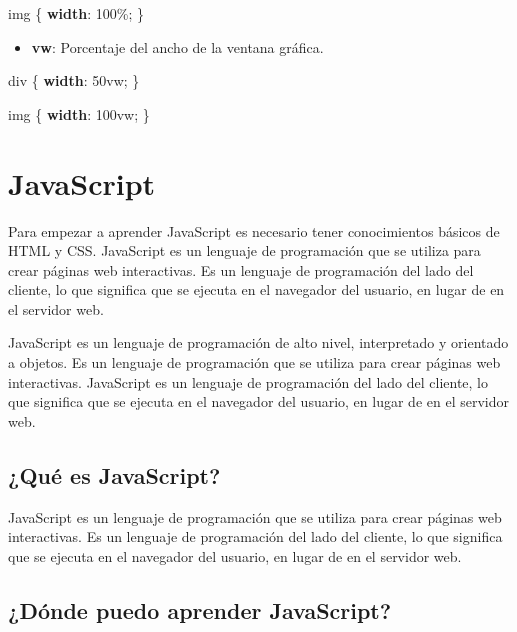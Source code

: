 \documentclass[
  a4paper,
  DIV=11,
  numbers=noendperiod,
  onepage,
  openany]{scrreprt}
\newenvironment{Shaded}{\begin{snugshade}}{\end{snugshade}}
\newcommand{\CharTok}[1]{\textcolor[rgb]{0.13,0.47,0.30}{#1}}
\newcommand{\DataTypeTok}[1]{\textcolor[rgb]{0.68,0.00,0.00}{#1}}
\newcommand{\DecValTok}[1]{\textcolor[rgb]{0.68,0.00,0.00}{#1}}
\newcommand{\KeywordTok}[1]{\textcolor[rgb]{0.00,0.23,0.31}{\textbf{#1}}}
\newcommand{\NormalTok}[1]{\textcolor[rgb]{0.00,0.23,0.31}{#1}}
\newcommand{\OperatorTok}[1]{\textcolor[rgb]{0.37,0.37,0.37}{#1}}
\providecommand{\tightlist}{%
  \setlength{\itemsep}{0pt}\setlength{\parskip}{0pt}}\usepackage{longtable,booktabs,array}
\begin{document}
\begin{tcolorbox}
\begin{Shaded}
\begin{Highlighting}[]
\NormalTok{img \{}
  \KeywordTok{width}\CharTok{:} \DecValTok{100}\DataTypeTok{\%}\OperatorTok{;}
\NormalTok{\}}
\end{Highlighting}
\end{Shaded}

\begin{itemize}
\tightlist
\item
  \textbf{vw}: Porcentaje del ancho de la ventana gráfica.
\end{itemize}

\begin{Shaded}
\begin{Highlighting}[]
\NormalTok{div \{}
  \KeywordTok{width}\CharTok{:} \DecValTok{50}\DataTypeTok{vw}\OperatorTok{;}
\NormalTok{\}}

\NormalTok{img \{}
  \KeywordTok{width}\CharTok{:} \DecValTok{100}\DataTypeTok{vw}\OperatorTok{;}
\NormalTok{\}}
\end{Highlighting}
\end{Shaded}

\chapter{JavaScript}\label{javascript}

Para empezar a aprender JavaScript es necesario tener conocimientos
básicos de HTML y CSS. JavaScript es un lenguaje de programación que se
utiliza para crear páginas web interactivas. Es un lenguaje de
programación del lado del cliente, lo que significa que se ejecuta en el
navegador del usuario, en lugar de en el servidor web.

JavaScript es un lenguaje de programación de alto nivel, interpretado y
orientado a objetos. Es un lenguaje de programación que se utiliza para
crear páginas web interactivas. JavaScript es un lenguaje de
programación del lado del cliente, lo que significa que se ejecuta en el
navegador del usuario, en lugar de en el servidor web.

\section{¿Qué es JavaScript?}\label{quuxe9-es-javascript}

JavaScript es un lenguaje de programación que se utiliza para crear
páginas web interactivas. Es un lenguaje de programación del lado del
cliente, lo que significa que se ejecuta en el navegador del usuario, en
lugar de en el servidor web.

\section{¿Dónde puedo aprender
JavaScript?}\label{duxf3nde-puedo-aprender-javascript}


\end{tcolorbox}
\end{document}

